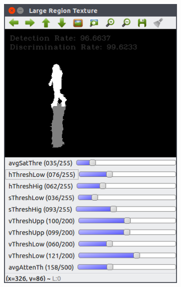 \documentclass[12pt]{report}
\begin{document}
\begin{figure}
  \centering
  \begin{subfigure}{.48\linewidth}
    \includegraphics[width=1\linewidth]{figures/background/lr_caviar_default.png}
    \caption{}
  \end{subfigure}
  \hfill
  \begin{subfigure}{.49\linewidth}

\end{subfigure}
\end{figure}
\end{document}
